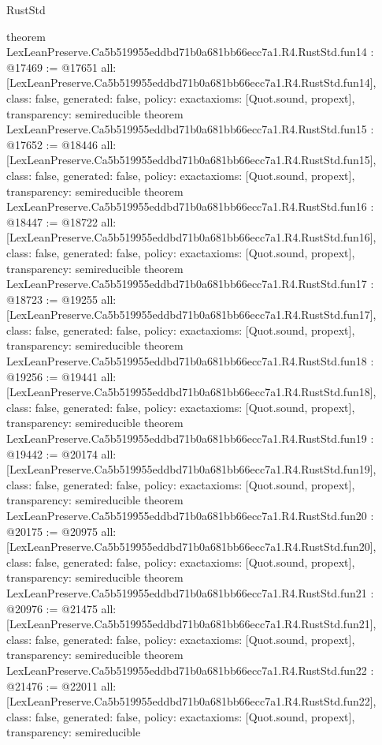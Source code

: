 \begin{lexlean}{RustStd}
\begin{coremodule}
{}
theorem LexLeanPreserve.Ca5b519955eddbd71b0a681bb66ecc7a1.R4.RustStd.fun14 : @17469 := @17651 {
  all: [LexLeanPreserve.Ca5b519955eddbd71b0a681bb66ecc7a1.R4.RustStd.fun14],
  class: false,
  generated: false,
  policy: exact{axioms: [Quot.sound, propext]},
  transparency: semireducible
}
theorem LexLeanPreserve.Ca5b519955eddbd71b0a681bb66ecc7a1.R4.RustStd.fun15 : @17652 := @18446 {
  all: [LexLeanPreserve.Ca5b519955eddbd71b0a681bb66ecc7a1.R4.RustStd.fun15],
  class: false,
  generated: false,
  policy: exact{axioms: [Quot.sound, propext]},
  transparency: semireducible
}
theorem LexLeanPreserve.Ca5b519955eddbd71b0a681bb66ecc7a1.R4.RustStd.fun16 : @18447 := @18722 {
  all: [LexLeanPreserve.Ca5b519955eddbd71b0a681bb66ecc7a1.R4.RustStd.fun16],
  class: false,
  generated: false,
  policy: exact{axioms: [Quot.sound, propext]},
  transparency: semireducible
}
theorem LexLeanPreserve.Ca5b519955eddbd71b0a681bb66ecc7a1.R4.RustStd.fun17 : @18723 := @19255 {
  all: [LexLeanPreserve.Ca5b519955eddbd71b0a681bb66ecc7a1.R4.RustStd.fun17],
  class: false,
  generated: false,
  policy: exact{axioms: [Quot.sound, propext]},
  transparency: semireducible
}
theorem LexLeanPreserve.Ca5b519955eddbd71b0a681bb66ecc7a1.R4.RustStd.fun18 : @19256 := @19441 {
  all: [LexLeanPreserve.Ca5b519955eddbd71b0a681bb66ecc7a1.R4.RustStd.fun18],
  class: false,
  generated: false,
  policy: exact{axioms: [Quot.sound, propext]},
  transparency: semireducible
}
theorem LexLeanPreserve.Ca5b519955eddbd71b0a681bb66ecc7a1.R4.RustStd.fun19 : @19442 := @20174 {
  all: [LexLeanPreserve.Ca5b519955eddbd71b0a681bb66ecc7a1.R4.RustStd.fun19],
  class: false,
  generated: false,
  policy: exact{axioms: [Quot.sound, propext]},
  transparency: semireducible
}
theorem LexLeanPreserve.Ca5b519955eddbd71b0a681bb66ecc7a1.R4.RustStd.fun20 : @20175 := @20975 {
  all: [LexLeanPreserve.Ca5b519955eddbd71b0a681bb66ecc7a1.R4.RustStd.fun20],
  class: false,
  generated: false,
  policy: exact{axioms: [Quot.sound, propext]},
  transparency: semireducible
}
theorem LexLeanPreserve.Ca5b519955eddbd71b0a681bb66ecc7a1.R4.RustStd.fun21 : @20976 := @21475 {
  all: [LexLeanPreserve.Ca5b519955eddbd71b0a681bb66ecc7a1.R4.RustStd.fun21],
  class: false,
  generated: false,
  policy: exact{axioms: [Quot.sound, propext]},
  transparency: semireducible
}
theorem LexLeanPreserve.Ca5b519955eddbd71b0a681bb66ecc7a1.R4.RustStd.fun22 : @21476 := @22011 {
  all: [LexLeanPreserve.Ca5b519955eddbd71b0a681bb66ecc7a1.R4.RustStd.fun22],
  class: false,
  generated: false,
  policy: exact{axioms: [Quot.sound, propext]},
  transparency: semireducible
}
\end{coremodule}
\end{lexlean}

